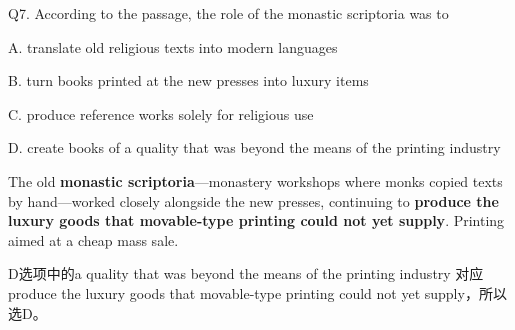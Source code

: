 \begin{blk}
    \begin{qst}
        Q7. According to the passage, the role of the monastic scriptoria was to
    \end{qst}

    \begin{chc}
        A. translate old religious texts into modern languages

        B. turn books printed at the new presses into luxury items

        C. produce reference works solely for religious use

        D. create books of a quality that was beyond the means of the printing industry
    \end{chc}

    \begin{psgq}
        The old \textbf{monastic scriptoria}—monastery workshops where monks copied texts by hand—worked closely alongside the new presses, continuing to \textbf{produce the luxury goods that movable-type printing could not yet supply}. Printing aimed at a cheap mass sale.
    \end{psgq}

    \begin{nlz}
        D选项中的a quality that was beyond the means of the printing industry 对应produce the luxury goods that movable-type printing could not yet supply，所以选D。
    \end{nlz}
\end{blk}


